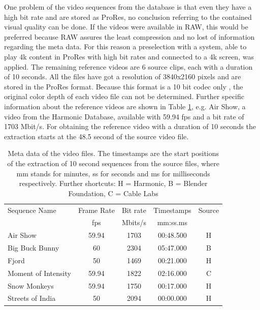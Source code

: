 One problem of the video sequences from the database is that even they have a high bit rate and are stored as ProRes, no conclusion referring to the contained visual quality can be done. If the videos were available in RAW, this would be preferred because RAW assures the least compression and no lost of information regarding the meta data.
For this reason a preselection with a system, able to play 4k content in ProRes with high bit rates and connected to a 4k screen, was applied.
The remaining reference videos are 6 source clips, each with a duration of 10 seconds. All the files have got a resolution of 3840x2160 pixels and are stored in the ProRes format. Because this format is a 10 bit codec only \cite{web:ProRes}, the original color depth of each video file can not be determined.
Further specific information about the reference videos are shown in Table \ref{tab:Specifications}, e.g. Air Show, a video from the Harmonic Database, available with 59.94 fps and a bit rate of 1703 Mbit/s. For obtaining the reference video with a duration of 10 seconds the extraction starts at the 48.5 second of the source video file.

\begin{table}[hbt!]
	\renewcommand{\arraystretch}{1.3}
	\centering
	\caption{Meta data of the video files. The timestamps are the start positions of the extraction of 10 second sequences from the source files, where mm stands for minutes, ss for seconds and ms for milliseconds respectively. Further shortcuts: H = Harmonic, B = Blender Foundation, C = Cable Labs}
	\label{tab:Specifications}
	\begin{tabular}{lcccc}
		\toprule
		Sequence Name       & Frame Rate & Bit rate & Timestamps & Source\\
		& fps  	   & Mbits/s    & mm:ss.ms   & \\
		\midrule
		Air Show            & 59.94    & 1703 & 00:48.500  &   H  \\
		Big Buck Bunny      & 60       & 2304 & 05:47.000  &   B  \\
		Fjord               & 50       & 1469 & 00:21.000  &   H  \\
		Moment of Intensity & 59.94    & 1822 & 02:16.000  &   C \\
		Snow Monkeys        & 59.94    & 1750 & 00:17.000  &   H  \\
		Streets of India    & 50       & 2094 & 00:00.000  &   H  \\
		\bottomrule
	\end{tabular}
\end{table}

